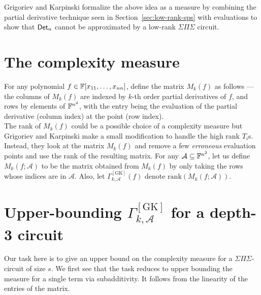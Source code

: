 \documentclass[12pt]{report}
\newcommand{\CM}[1]{\Gamma^{\mathrm{[#1]}}}
\newcommand{\SPS}{\Sigma\Pi\Sigma}
\begin{document}

Grigoriev and Karpinski \cite{grigoriev98} formalize the above idea as
a measure by combining the partial derivative technique seen in Section~\ref{sec:low-rank-sps} with evaluations  to show that $\mathsf{Det}_n$ cannot be
approximated by a low-rank $\SPS$ circuit.

\section{The complexity measure}

For any polynomial $f \in \mathbb{F}[x_{11},\dots, x_{nn}]$, define the matrix
$M_k(f)$ as follows --- the columns of $M_k(f)$ are indexed by $k$-th
order partial derivatives of $f$, and rows by elements of $\mathbb{F}^{n^2}$,
with the entry being the evaluation of the partial derivative (column
index) at the point (row index).\\

The rank of $M_k(f)$ could be a possible choice of a complexity
measure but Grigoriev and Karpinski make a small
modification to handle the high rank $T_i$s. Instead, they look at the matrix $M_k(f)$ and remove a
few \emph{erroneous} evaluation points and use the rank of the
resulting matrix. For any $\mathcal{A}\subseteq \mathbb{F}^{n^2}$, let us
define $M_k(f;\mathcal{A})$ to be the matrix obtained from $M_k(f)$ by
only taking the rows whose indices are in
$\mathcal{A}$. Also, let $\CM{GK}_{k,\mathcal{A}}(f)$
denote $\mathrm{rank}(M_k(f;\mathcal{A}))$.



\section{Upper-bounding $\CM{GK}_{k,\mathcal{A}}$ for a depth-3 circuit}\label{sec:gk-upper-bound}

Our task here is to give an upper bound on the complexity measure for
	a $\SPS$-circuit of size $s$. We first see that the task reduces to 
	upper bounding the measure for a single term via subadditivity. It 
	follows from the linearity of the entries of the matrix. 
\end{document}
